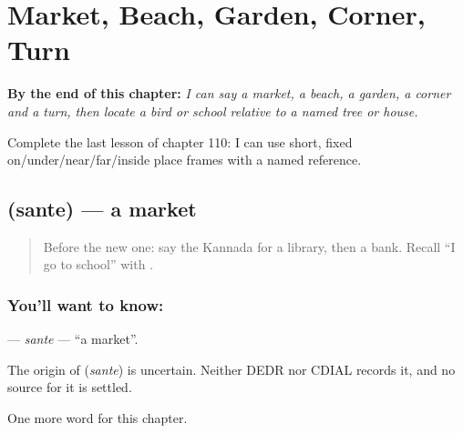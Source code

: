 
\chapter{Market, Beach, Garden, Corner, Turn}
\label{ch:ka-market-beach-garden-corner-turn}

\begin{chapteropening}
\textbf{By the end of this chapter:} \emph{I can say a market, a beach, a garden, a corner and a turn, then locate a bird or school relative to a named tree or house.}

Complete the last lesson of chapter 110: I can use short, fixed on/under/near/far/inside place frames with a named reference.
\end{chapteropening}

\section[\texorpdfstring{\kn{ಸಂತೆ} (sante)}{ಸಂತೆ (sante)}]{ (sante) — a market}

\label{lesson:KA-C110-sante}



\begin{quote}
Before the new one: say the Kannada for a library, then a bank. Recall “I go to school” with \textbf{}.
\end{quote}

\subsection*{You'll want to know: }
\textbf{} — \emph{sante} — \textquotedblleft{}a market\textquotedblright{}.

\begin{cousinweb}
The origin of \textbf{} (\emph{sante}) is uncertain. Neither DEDR nor CDIAL records it, and no source for it is settled.
\end{cousinweb}

\begin{grammarlens}[title={What you've built}]
One more word for this chapter.
\end{grammarlens}

